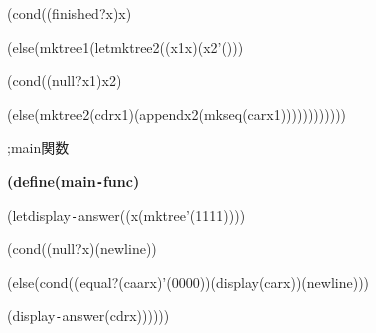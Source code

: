 \documentclass{article}
\begin{document}
\noindent
\mbox{}{\tt\mc {}\charwd}(cond{\tt\mc {}\charwd}((finished?{\tt\mc {}\charwd}x){\tt\mc {}\charwd}x)

\noindent
\mbox{}{\tt\mc {}\charwd}{\tt\mc {}\charwd}(else{\tt\mc {}\charwd}(mktree1{\tt\mc {}\charwd}(let{\tt\mc {}\charwd}mktree2{\tt\mc {}\charwd}((x1{\tt\mc {}\charwd}x){\tt\mc {}\charwd}(x2{\tt\mc {}\charwd}'()))

\noindent
\mbox{}{\tt\mc {}\charwd}{\tt\mc {}\charwd}{\tt\mc {}\charwd}{\tt\mc {}\charwd}(cond{\tt\mc {}\charwd}((null?{\tt\mc {}\charwd}x1){\tt\mc {}\charwd}x2)

\noindent
\mbox{}{\tt\mc {}\charwd}{\tt\mc {}\charwd}{\tt\mc {}\charwd}{\tt\mc {}\charwd}{\tt\mc {}\charwd}(else{\tt\mc {}\charwd}(mktree2{\tt\mc {}\charwd}(cdr{\tt\mc {}\charwd}x1){\tt\mc {}\charwd}(append{\tt\mc {}\charwd}x2{\tt\mc {}\charwd}(mkseq{\tt\mc {}\charwd}(car{\tt\mc {}\charwd}x1))))))))))))

\noindent
\mbox{}\hfill

\noindent
\mbox{}\bf \bf %

\noindent
\mbox{};\charwd main\charwd 関数

\noindent
\mbox{}\bf (define{\bf {}\charwd}(main{\tt -}func)

\noindent
\mbox{}{\bf {}\charwd}(let{\bf {}\charwd}display{\tt -}answer{\bf {}\charwd}((x{\bf {}\charwd}(mktree{\bf {}\charwd}'(1{\bf {}\charwd}1{\bf {}\charwd}1{\bf {}\charwd}1))))

\noindent
\mbox{}{\bf {}\charwd}(cond{\bf {}\charwd}((null?{\bf {}\charwd}x){\bf {}\charwd}(newline))

\noindent
\mbox{}{\bf {}\charwd}{\bf {}\charwd}(else{\bf {}\charwd}(cond{\bf {}\charwd}((equal?{\bf {}\charwd}(caar{\bf {}\charwd}x){\bf {}\charwd}'(0{\bf {}\charwd}0{\bf {}\charwd}0{\bf {}\charwd}0)){\bf {}\charwd}(display{\bf {}\charwd}(car{\bf {}\charwd}x)){\bf {}\charwd}(newline)))

\noindent
\mbox{}{\bf {}\charwd}{\bf {}\charwd}(display{\tt -}answer{\bf {}\charwd}(cdr{\bf {}\charwd}x))))))

\noindent
\mbox{}

\rm\mc
\end{document}
